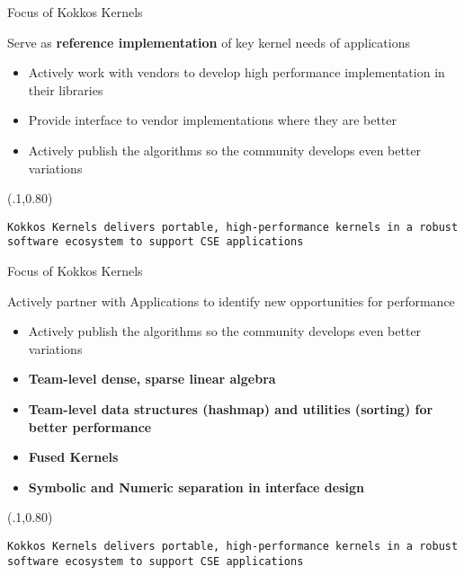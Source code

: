 \begin{frame}[fragile]{Focus of Kokkos Kernels}

Serve as \textbf{reference implementation} of key kernel needs of applications
\begin{itemize}
  \item Actively work with vendors to develop high performance implementation in their libraries
  \item Provide interface to vendor implementations where they are better
  \item Actively publish the algorithms so the community develops even better variations
\end{itemize}

\begin{textblock*}{1.0\textwidth}(.1\textwidth,0.80\textheight)
  \begin{lstlisting}[frame=single, backgroundcolor=\color{blue!10}, basicstyle=\tiny, breaklines=true, boxpos=c]
    Kokkos Kernels delivers portable, high-performance kernels in a robust software ecosystem to support CSE applications
  \end{lstlisting}
\end{textblock*}

\end{frame}

\begin{frame}[fragile]{Focus of Kokkos Kernels}

Actively partner with Applications to identify new opportunities for performance
\begin{itemize}
  \item Actively publish the algorithms so the community develops even better variations
  \item \textbf{Team-level dense, sparse linear algebra}
  \item \textbf{Team-level data structures (hashmap) and utilities (sorting) for better performance}
  \item \textbf{Fused Kernels}
  \item \textbf{Symbolic and Numeric separation in interface design}
\end{itemize}

\begin{textblock*}{1.0\textwidth}(.1\textwidth,0.80\textheight)
  \begin{lstlisting}[frame=single, backgroundcolor=\color{blue!10}, basicstyle=\tiny, breaklines=true, boxpos=c]
    Kokkos Kernels delivers portable, high-performance kernels in a robust software ecosystem to support CSE applications
  \end{lstlisting}
\end{textblock*}

\end{frame}


